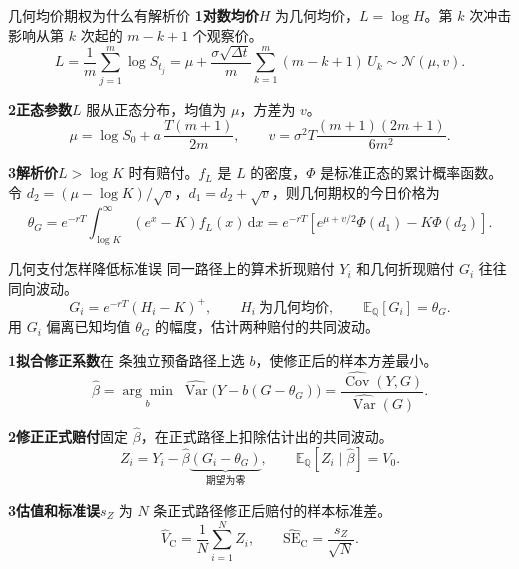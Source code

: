 \begin{frame}{几何均价期权为什么有解析价}
\textbf{1\quad 对数均价}\quad \(H\) 为几何均价，\(L=\log H\)。第 \(k\) 次冲击影响从第 \(k\) 次起的 \(m-k+1\) 个观察价。
\[
 L=\frac1m\sum_{j=1}^{m}\log S_{t_j}
   =\mu+\frac{\sigma\sqrt{\Delta t}}{m}\sum_{k=1}^m(m-k+1)\,U_k
   \sim\mathcal N(\mu,v).
\]

\textbf{2\quad 正态参数}\quad \(L\) 服从正态分布，均值为 \(\mu\)，方差为 \(v\)。
\[
 \mu=\log S_0+a\,\frac{T(m+1)}{2m},
 \qquad v=\sigma^2T\frac{(m+1)(2m+1)}{6m^2}.
\]

\textbf{3\quad 解析价}\quad \(L>\log K\) 时有赔付。\(f_L\) 是 \(L\) 的密度，\(\Phi\) 是标准正态的累计概率函数。\\
令 \(d_2=(\mu-\log K)/\sqrt v\)，\(d_1=d_2+\sqrt v\)，则几何期权的今日价格为
\[
 \theta_G=e^{-rT}\int_{\log K}^{\infty}(e^x-K)f_L(x)\,\mathrm dx
 =e^{-rT}\!\left[e^{\mu+v/2}\Phi(d_1)-K\Phi(d_2)\right].
\]
\end{frame}

\begin{frame}{几何支付怎样降低标准误}
同一路径上的算术折现赔付 \(Y_i\) 和几何折现赔付 \(G_i\) 往往同向波动。
\[
 G_i=e^{-rT}(H_i-K)^+,\qquad
 H_i\ \text{为几何均价},\qquad \mathbb E_{\mathbb Q}[G_i]=\theta_G.
\]
用 \(G_i\) 偏离已知均值 \(\theta_G\) 的幅度，估计两种赔付的共同波动。

\medskip
\textbf{1\quad 拟合修正系数}\quad 在 \SlidePilotPaths{} 条独立预备路径上选 \(b\)，使修正后的样本方差最小。
\[
 \widehat\beta
 =\underset{b}{\arg\min}\;\widehat{\operatorname{Var}}\!\bigl(Y-b(G-\theta_G)\bigr)
 =\frac{\widehat{\operatorname{Cov}}(Y,G)}{\widehat{\operatorname{Var}}(G)}.
\]

\textbf{2\quad 修正正式赔付}\quad 固定 \(\widehat\beta\)，在正式路径上扣除估计出的共同波动。
\[
 Z_i=Y_i-\widehat\beta\underbrace{(G_i-\theta_G)}_{\text{期望为零}},
 \qquad \mathbb E_{\mathbb Q}[Z_i\mid\widehat\beta]=V_0.
\]

\textbf{3\quad 估值和标准误}\quad \(s_Z\) 为 \(N\) 条正式路径修正后赔付的样本标准差。
\[
 \widehat V_{\mathrm C}=\frac1N\sum_{i=1}^N Z_i,\qquad
 \widehat{\mathrm{SE}}_{\mathrm C}=\frac{s_Z}{\sqrt N}.
\]
\end{frame}

